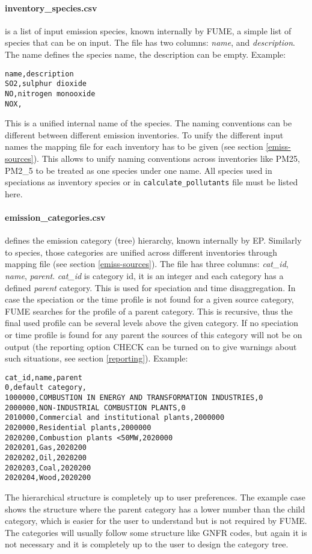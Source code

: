 \documentclass[a4paper,11pt]{article}
\begin{document}
\paragraph{inventory\_species.csv} 
is a list of input emission species, known internally by FUME, a simple list of species that can be on input. The file has two columns: {\em name}, and {\em description}. The name defines the species name, the description can be empty. Example:
\begin{verbatim}
name,description
SO2,sulphur dioxide
NO,nitrogen monooxide   
NOX,
\end{verbatim}
This is a unified internal name of the species. The naming conventions can be different between different emission inventories. To unify the different input names the mapping file for each inventory has to be given (see section \ref{emiss-sources}). This allows to unify naming conventions across inventories like PM25, PM2\_5 to be treated as one species under one name.
All species used in speciations as inventory species or in \verb|calculate_pollutants| file must be listed here.

\paragraph{emission\_categories.csv}
defines the emission category (tree) hierarchy, known internally by EP.
Similarly to species, those categories are unified across different
inventories through mapping file (see section \ref{emiss-sources}). The file has
three columns: {\em cat\_id}, {\em name}, {\em parent}. {\em cat\_id} is category id, it is an integer
and each category has a defined {\em parent} category. This is used for
speciation and time disaggregation. In case the speciation or the time
profile is not found for a given source category, FUME searches for the
profile of a parent category. This is recursive, thus the final used
profile can be several levels above the given category. If no speciation
or time profile is found for any parent the sources of this category
will not be on output (the reporting option CHECK can be turned on to give warnings about such situations, see section \ref{reporting}). Example:
\begin{verbatim}
cat_id,name,parent
0,default category,
1000000,COMBUSTION IN ENERGY AND TRANSFORMATION INDUSTRIES,0
2000000,NON-INDUSTRIAL COMBUSTION PLANTS,0
2010000,Commercial and institutional plants,2000000
2020000,Residential plants,2000000
2020200,Combustion plants <50MW,2020000
2020201,Gas,2020200
2020202,Oil,2020200
2020203,Coal,2020200
2020204,Wood,2020200
\end{verbatim}
The hierarchical structure is completely up to user preferences. The example case shows the structure where the parent category has a lower number than the child category, which is easier for the user to understand but is not required by FUME. The categories will usually follow some structure like GNFR codes, but again it is not necessary and it is completely up to the user to design the category tree.
\end{document}

